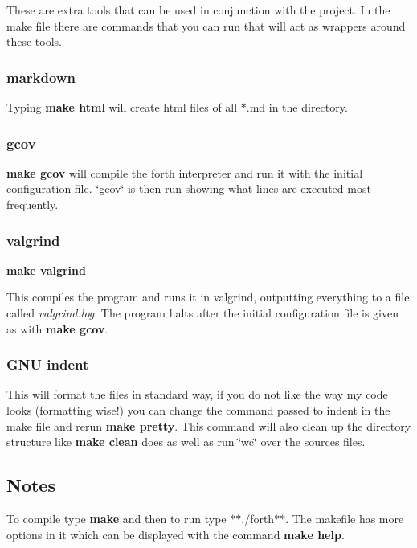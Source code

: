 These are extra tools that can be used in conjunction with the project. In the make file there are commands that you can run that will act as wrappers around these tools.

\subsubsection*{markdown}

Typing {\bfseries make html} will create html files of all $\ast$.md in the directory.

\subsubsection*{gcov}

{\bfseries make gcov} will compile the forth interpreter and run it with the initial configuration file. \char`\"{}gcov\char`\"{} is then run showing what lines are executed most frequently.

\subsubsection*{valgrind}

{\bfseries make valgrind}

This compiles the program and runs it in valgrind, outputting everything to a file called {\itshape valgrind.\-log}. The program halts after the initial configuration file is given as with {\bfseries make gcov}.

\subsubsection*{G\-N\-U indent}

This will format the files in standard way, if you do not like the way my code looks (formatting wise!) you can change the command passed to indent in the make file and rerun {\bfseries make pretty}. This command will also clean up the directory structure like {\bfseries make clean} does as well as run \char`\"{}wc\char`\"{} over the sources files.

\subsection*{Notes}

To compile type {\bfseries make} and then to run type $\ast$$\ast$./forth$\ast$$\ast$. The makefile has more options in it which can be displayed with the command {\bfseries make help}.

